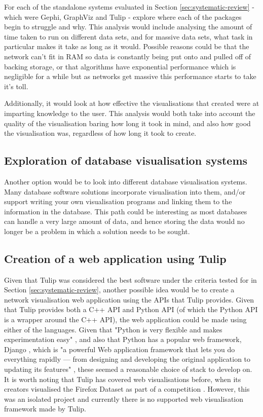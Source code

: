 \documentclass[../dissertation.tex]{subfiles}
\begin{document}
For each of the standalone systems evaluated in Section \ref{sec:systematic-review} - which were Gephi, GraphViz and Tulip - explore where each of the packages begin to struggle and why. This analysis would include analysing the amount of time taken to run on different data sets, and for massive data sets, what task in particular makes it take as long as it would. Possible reasons could be that the network can't fit in RAM so data is constantly being put onto and pulled off of backing storage, or that algorithms have exponential performance which is negligible for a while but as networks get massive this performance starts to take it's toll. 

Additionally, it would look at how effective the visualisations that created were at imparting knowledge to the user. This analysis would both take into account the quality of the visualisation baring how long it took in mind, and also how good the visualisation was, regardless of how long it took to create. 

\subsection{Exploration of database visualisation systems}

Another option would be to look into different database visualisation systems. Many database software solutions incorporate visualisation into them, and/or support writing your own visualisation programs and linking them to the information in the database. This path could be interesting as most databases can handle a very large amount of data, and hence storing the data would no longer be a problem in which a solution needs to be sought. 

\subsection{Creation of a web application using Tulip}

Given that Tulip was considered the best software under the criteria tested for in Section \ref{sec:systematic-review}, another possible idea would be to create a network visualisation web application using the APIs that Tulip provides. Given that Tulip provides both a C++ API \cite{tulipcppapi} and Python API \cite{tulippyapi} (of which the Python API is a wrapper around the C++ API), the web application could be made using either of the languages. Given that "Python is very flexible and makes experimentation easy" \cite{zelle2004python}, and also that Python has a popular web framework, Django \cite{django}, which is "a powerful Web application framework that lets you do everything rapidly — from designing and developing the original application to updating its features" \cite{forcier2008python}, these seemed a reasonable choice of stack to develop on. It is worth noting that Tulip has covered web visualisations before, when its creators visualised the Firefox Dataset as part of a competition \cite{tulipfirefox}. However, this was an isolated project and currently there is no supported web visualisation framework made by Tulip.
\end{document}
